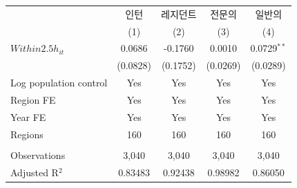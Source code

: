 \begingroup
\centering
\begin{tabular}{lcccc}
   \toprule
                          & 인턴     & 레지던트 & 전문의   & 일반의 \\   
                          & (1)      & (2)      & (3)      & (4)\\  
   \midrule 
   $Within2.5h_{it}$      & 0.0686   & -0.1760  & 0.0010   & 0.0729$^{**}$\\   
                          & (0.0828) & (0.1752) & (0.0269) & (0.0289)\\   
   Log population control & Yes      & Yes      & Yes      & Yes\\  
   Region FE              & Yes      & Yes      & Yes      & Yes\\  
   Year FE                & Yes      & Yes      & Yes      & Yes\\  
   Regions                & 160      & 160      & 160      & 160\\  
    \\
   Observations           & 3,040    & 3,040    & 3,040    & 3,040\\  
   Adjusted R$^2$         & 0.83483  & 0.92438  & 0.98982  & 0.86050\\  
   \bottomrule
\end{tabular}
\par\endgroup
